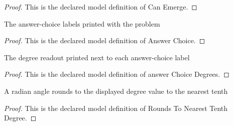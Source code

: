 \begin{proof}
  This is the declared model definition of Can Emerge.
\end{proof}
\begin{definition}
  \label{def:physics:phyx-mini-0009:phyxminiproblems-problemphyxmini0009-answerchoice}
  The answer-choice labels printed with the problem
\end{definition}
\begin{proof}
  This is the declared model definition of Answer Choice.
\end{proof}
\begin{definition}
  \label{def:physics:phyx-mini-0009:phyxminiproblems-problemphyxmini0009-answerchoicedegrees}
  The degree readout printed next to each answer-choice label
\end{definition}
\begin{proof}
  This is the declared model definition of answer Choice Degrees.
\end{proof}
\begin{definition}
  \label{def:physics:phyx-mini-0009:phyxminiproblems-problemphyxmini0009-roundstonearesttenthdegree}
  A radian angle rounds to the displayed degree value to the nearest tenth
\end{definition}
\begin{proof}
  This is the declared model definition of Rounds To Nearest Tenth Degree.
\end{proof}
